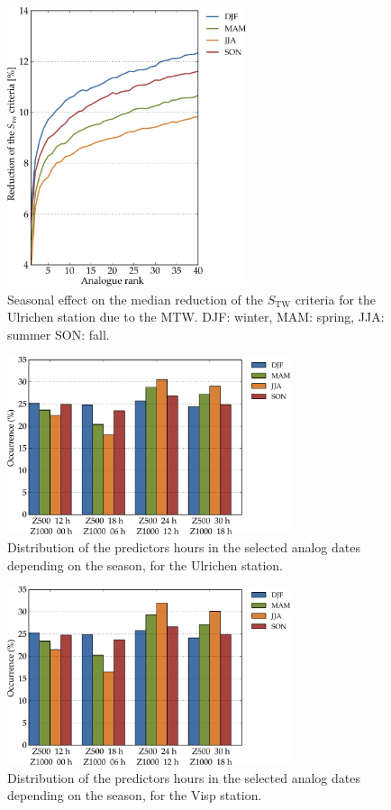 \documentclass[hess, manuscript]{copernicus}
\begin{document}
\begin{figure}[htb]
	\begin{center}
		\includegraphics[width=7cm]{figures/changes_S1_seasons.pdf}
	\end{center}
	\caption{Seasonal effect on the median reduction of the $S_{\text{TW}}$ criteria for the Ulrichen station due to the MTW. DJF: winter, MAM: spring, JJA: summer SON: fall.}
	\label{fig:changes_S1_seasons}
\end{figure}

\begin{figure}[htb]
	\includegraphics[width=8.3cm]{figures/hours_selection_per_season.pdf}
	\caption{Distribution of the predictors hours in the selected analog dates depending on the season, for the Ulrichen station.}
	\label{fig:hours_selection_per_season}
\end{figure}

\begin{figure}[htb]
	\includegraphics[width=8.3cm]{figures/hours_selection_per_season_Visp.pdf}
	\caption{Distribution of the predictors hours in the selected analog dates depending on the season, for the Visp station.}
	\label{fig:hours_selection_per_season_Visp}
\end{figure}
\end{document}
